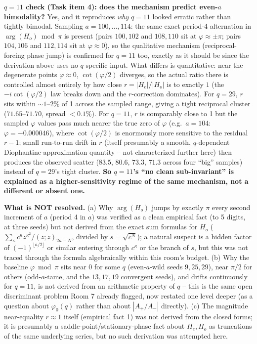 \textbf{$q=11$ check (Task item 4): does the mechanism predict even-$a$ bimodality?} Yes, and it
reproduces \emph{why} $q=11$ looked erratic rather than tightly bimodal. Sampling
$a=100,\dots,114$: the same exact period-4 alternation in $\arg(H_o)\bmod\pi$ is present (pairs
$100,102$ and $108,110$ sit at $\varphi\approx\pm\pi$; pairs $104,106$ and $112,114$ sit at
$\varphi\approx0$), so the qualitative mechanism (reciprocal-forcing phase jump) is confirmed for
$q=11$ too, exactly as it should be since the derivation above uses no $q$-specific input. What
differs is quantitative: near the degenerate points $\varphi\approx0$, $\cot(\varphi/2)$ diverges,
so the actual ratio there is controlled almost entirely by how close $r=|H_e|/|H_o|$ is to exactly
$1$ (the $-i\cot(\varphi/2)$ law breaks down and the $r$-correction dominates). For $q=29$, $r$ sits
within $\sim\!1$--$2\%$ of 1 across the sampled range, giving a tight reciprocal cluster
($71.65$--$71.70$, spread $<0.1\%$). For $q=11$, $r$ is comparably close to 1 but the sampled
$\varphi$ values pass much nearer the true zero of $\varphi$ (e.g.\ $a=104$: $\varphi=-0.000046$),
where $\cot(\varphi/2)$ is enormously more sensitive to the residual $r-1$; small run-to-run
drift in $r$ (itself presumably a smooth, $q$-dependent Diophantine-approximation quantity --
not characterized further here) then produces the observed scatter ($83.5,\,80.6,\,73.3,\,71.3$
across four ``big'' samples) instead of $q=29$'s tight cluster. \textbf{So $q=11$'s ``no clean
sub-invariant'' is explained as a higher-sensitivity regime of the same mechanism, not a
different or absent one.}

\textbf{What is NOT resolved.} (a) Why $\arg(H_o)$ jumps by exactly $\pi$ every second increment
of $a$ (period 4 in $a$) was verified as a clean empirical fact (to 5 digits, at three seeds) but
not derived from the exact sum formulas for $H_o$ ($\sum_\kappa c^\kappa z^{\kappa^2}/(z;z)_{2\kappa-N}$,
divided by $s=\sqrt{c^N}$); a natural suspect is a hidden factor of $(-1)^{\lfloor
a/2\rfloor}$ or similar entering through $c^\kappa$ or the branch of $s$, but this was not
traced through the formula algebraically within this room's budget. (b) Why the baseline
$\varphi \bmod \pi$ sits near $0$ for some $q$ (even-$a$-wild seeds $9,25,29$), near $\pi/2$ for
others (odd-$a$-tame, and the $13,17,19$ convergent seeds), and drifts continuously for $q=11$,
is not derived from an arithmetic property of $q$ -- this is the same open discriminant problem
Room 7 already flagged, now restated one level deeper (as a question about $\varphi_0(q)$ rather
than about $|A_+/A_-|$ directly). (c) The magnitude near-equality $r\approx1$ itself (empirical
fact 1) was not derived from the closed forms; it is presumably a saddle-point/stationary-phase
fact about $H_e,H_o$ as truncations of the same underlying series, but no such derivation was
attempted here.

